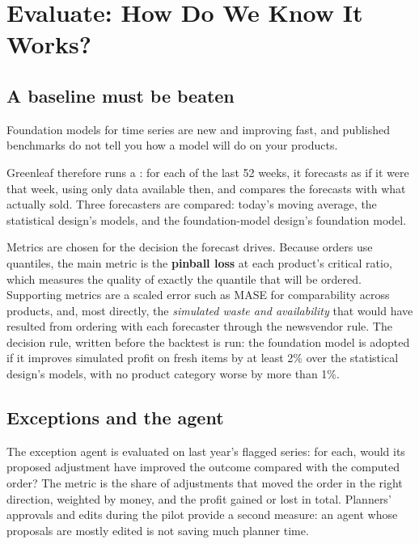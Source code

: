 \section{Evaluate: How Do We Know It Works?}
\label{sec:fc-evaluate}

\subsection{A baseline must be beaten}

\begin{watchout}
Foundation models for time series are new and improving fast, and published benchmarks do not tell you how a model will do on your products.
\end{watchout} Greenleaf therefore runs a : for each of the last 52 weeks, it forecasts as if it were that week, using only data available then, and compares the forecasts with what actually sold. Three forecasters are compared: today's moving average, the statistical design's models, and the foundation-model design's foundation model.

Metrics are chosen for the decision the forecast drives. Because orders use quantiles, the main metric is the \textbf{pinball loss} at each product's critical ratio, which measures the quality of exactly the quantile that will be ordered. Supporting metrics are a scaled error such as MASE for comparability across products, and, most directly, the \emph{simulated waste and availability} that would have resulted from ordering with each forecaster through the newsvendor rule. The decision rule, written before the backtest is run: the foundation model is adopted if it improves simulated profit on fresh items by at least 2\% over the statistical design's models, with no product category worse by more than 1\%.

\subsection{Exceptions and the agent}

The exception agent is evaluated on last year's flagged series: for each, would its proposed adjustment have improved the outcome compared with the computed order? The metric is the share of adjustments that moved the order in the right direction, weighted by money, and the profit gained or lost in total. Planners' approvals and edits during the pilot provide a second measure: an agent whose proposals are mostly edited is not saving much planner time.

